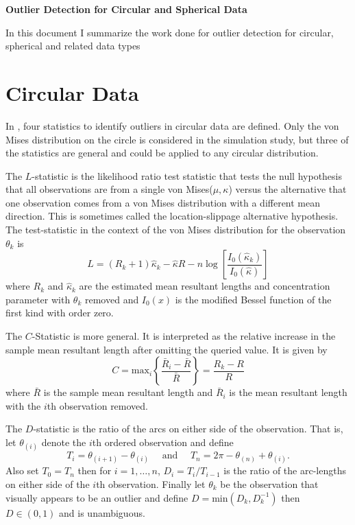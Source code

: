 \documentclass{article}\usepackage{graphicx, color}
\begin{document}
\begin{center}
\Large{\bf Outlier Detection for Circular and Spherical Data}
\end{center}
\normalsize
In this document I summarize the work done for outlier detection for circular, spherical and related data types

\section{Circular Data}

In \cite{collett1980}, four statistics to identify outliers in circular data are defined.  Only the von Mises distribution on the circle is considered in the simulation study, but three of the statistics are general and could be applied to any circular distribution. 

The $L$-statistic is the likelihood ratio test statistic that tests the null hypothesis that all observations are from a single von Mises($\mu,\kappa$) versus the alternative that one observation comes from a von Mises distribution with a different mean direction.  This is sometimes called the location-slippage alternative hypothesis.  The test-statistic in the context of the von Mises distribution for the observation $\theta_k$ is
\[
L=(R_k+1)\hat{\kappa}_k-\hat{\kappa}R-n\log\left[\frac{I_0(\hat{\kappa}_k)}{I_0(\hat{\kappa})}\right]
\]
where $R_k$ and $\hat\kappa_k$ are the estimated mean resultant lengths and concentration parameter with $\theta_k$ removed and $I_0(x)$ is the modified Bessel function of the first kind with order zero.

The $C$-Statistic is more general.  It is interpreted as the relative increase in the sample mean resultant length after omitting the queried value.  It is given by
\[
C=\text{max}_i\left\{\frac{\bar{R}_i-\bar{R}}{\bar{R}}\right\}=\frac{R_k-R}{R}
\]
where $\bar{R}$ is the sample mean resultant length and $\bar{R}_i$ is the mean resultant length with the $i$th observation removed.  

The $D$-statistic is the ratio of the arcs on either side of the observation.  That is, let $\theta_{(i)}$ denote the $i$th ordered observation and define
\[
T_i=\theta_{(i+1)}-\theta_{(i)}\hspace{1em}\text{ and }\hspace{1em}T_n=2\pi-\theta_{(n)}+\theta_{(i)}.
\]
 Also set $T_{0}=T_{n}$ then for $i=1,\dots,n$, $D_i=T_i/T_{i-1}$ is the ratio of the arc-lengths on either side of the $i$th observation.  Finally let $\theta_k$ be the observation that visually appears to be an outlier and define $D=\text{min}(D_k,D_{k}^{-1})$ then $D\in(0,1)$ and is unambiguous.
\end{document}
